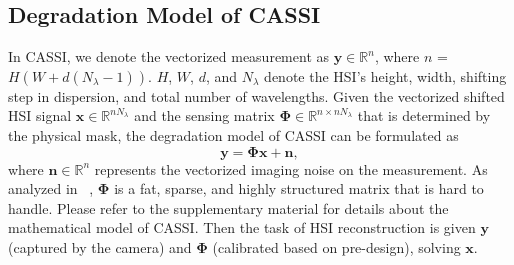 \documentclass{article}
\begin{document}
\subsection{Degradation Model of CASSI}
\vspace{-1mm}
In CASSI, we denote the vectorized measurement as $\mathbf{y} \in \mathbb{R}^{n}$, where $n$ = $H(W+d(N_\lambda-1))$. $H$, $W$, $d$, and $N_\lambda$ denote the HSI's height, width, shifting step in dispersion, and total number of wavelengths. Given the vectorized shifted HSI signal $\mathbf{x} \in \mathbb{R}^{nN_\lambda}$ and the sensing matrix $\mathbf{\Phi} \in \mathbb{R}^{n \times nN_\lambda}$ that is determined by the physical mask, the degradation model of CASSI can be  formulated as
\begin{equation}
	\mathbf{y} = \mathbf{\Phi} \mathbf{x} + \mathbf{n},
\end{equation}
where $\mathbf{n} \in \mathbb{R}^{n}$ represents the vectorized imaging noise on the measurement. As analyzed in ~\cite{Tropp07ITT,Donoho06ITT,jalali2019snapshot}, $\mathbf{\Phi}$ is a fat, sparse, and highly structured matrix that is hard to handle. Please refer to the supplementary material for details about the mathematical model of CASSI.  Then the  task of HSI reconstruction is given $\mathbf{y}$ (captured by the  camera) and $\mathbf{\Phi}$ (calibrated based on pre-design), solving $\mathbf{x}$.

\vspace{-1mm}
\end{document}
